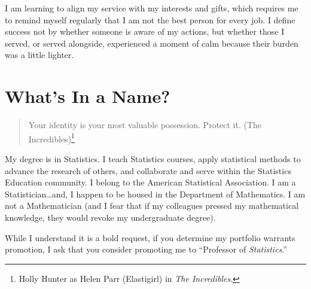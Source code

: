\documentclass[
  letterpaper,
  DIV=11,
  numbers=noendperiod]{scrreprt}
\begin{document}
\begin{tcolorbox}[enhanced jigsaw, titlerule=0mm, bottomtitle=1mm, coltitle=black, colback=white, opacityback=0, toptitle=1mm, rightrule=.15mm, bottomrule=.15mm, leftrule=.75mm, colbacktitle=quarto-callout-tip-color!10!white, arc=.35mm, toprule=.15mm, colframe=quarto-callout-tip-color-frame, left=2mm, breakable, opacitybacktitle=0.6, title=\textcolor{quarto-callout-tip-color}{\faLightbulb}\hspace{0.5em}{Operating in Places that Complement My Interests and Gifts}]

I am learning to align my service with my interests and gifts, which
requires me to remind myself regularly that I am not the best person for
every job. I define success not by whether someone is aware of my
actions, but whether those I served, or served alongside, experienced a
moment of calm because their burden was a little lighter.

\end{tcolorbox}


\chapter{What's In a Name?}\label{whats-in-a-name}

\begin{quote}
Your identity is your most valuable possession. Protect it. (The
Incredibles)\footnote{Holly Hunter as Helen Parr (Elastigirl) in
  \emph{The Incredibles}.}
\end{quote}

My degree is in Statistics. I teach Statistics courses, apply
statistical methods to advance the research of others, and collaborate
and serve within the Statistics Education community. I belong to the
American Statistical Association. I am a Statistician\ldots and, I
happen to be housed in the Department of Mathematics. I am not a
Mathematician (and I fear that if my colleagues pressed my mathematical
knowledge, they would revoke my undergraduate degree).

While I understand it is a bold request, if you determine my portfolio
warrants promotion, I ask that you consider promoting me to ``Professor
of \emph{Statistics}.''
\end{document}
